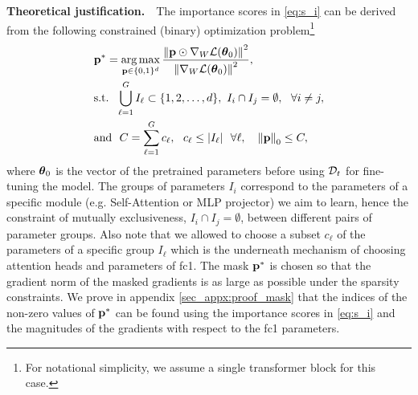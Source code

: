 \textbf{Theoretical justification.}~~The importance scores in \eqref{eq:s_i} can be derived from the following constrained (binary) optimization problem\footnote{For notational simplicity, we assume a single transformer block for this case.}
\begin{align}
 & \mathbf{p}^*  =  \operatorname*{arg\,max}_{\mathbf{p} \in \{0, 1 \}^d} \frac{\left\lVert\mathbf{p} \odot \nabla_W \mathcal{L}(\boldsymbol{\theta}_0) \right\rVert^2}{\left\lVert\nabla_W \mathcal{L}(\boldsymbol{\theta}_0)\right\rVert^2},  \label{eq:maxim} 
\\ & \text{s.t.}~~\bigcup_{\ell=1}^G I_{\ell} \subset \{1, 2, \ldots, d\},~I_i \cap I_j = \emptyset,~~\forall i\neq j, \nonumber \\
& \text{and}~~ C = \sum_{\ell=1}^G c_{\ell},~~c_{\ell} \leq |I_{\ell}|~~\forall \ell,~~~\left\lVert\mathbf{p}\right\rVert_0 \leq C, \nonumber
\end{align}
where $\boldsymbol{\theta}_0$ is the vector of the pretrained parameters before using $\mathcal{D}_t$ for fine-tuning the model. The groups of parameters $I_i$ correspond to the parameters of a specific module (e.g. Self-Attention or MLP projector) we aim to learn, hence the constraint of mutually exclusiveness, $I_i \cap I_j = \emptyset$, between different pairs of parameter groups. Also note that we allowed to choose a subset $c_{\ell}$ of the parameters of a specific group $I_{\ell}$ which is the underneath mechanism of \ours choosing attention heads and parameters of fc1. The mask $\mathbf{p}^*$ is chosen so that the gradient norm of the masked gradients is as large as possible under the sparsity constraints. We prove in appendix \ref{sec_appx:proof_mask} that the indices of the non-zero values of $\mathbf{p}^*$ can be found using the importance scores in \eqref{eq:s_i} and the magnitudes of the gradients with respect to the fc1 parameters. 
